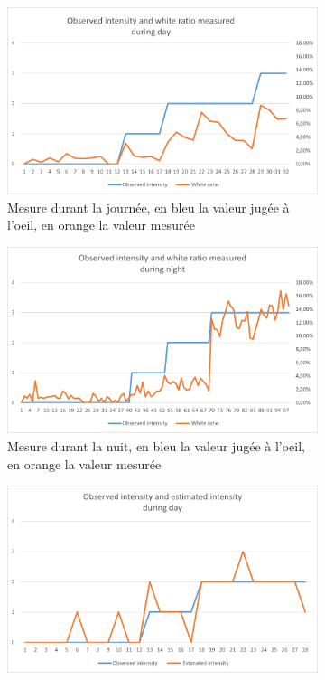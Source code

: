 \begin{figure}[H]
    \begin{subfigure}{.45\textwidth}
        \includegraphics[width=\linewidth]{Images/computer_vision/snowfall/dayMes.png}
        \caption{Mesure durant la journée, en bleu la valeur jugée à l'oeil, en orange la valeur mesurée}
        \label{fig:Snowfall_dayMes}
    \end{subfigure}
    \hfill
    \begin{subfigure}{.45\textwidth}
        \includegraphics[width=\linewidth]{Images/computer_vision/snowfall/nightMes.png}
        \caption{Mesure durant la nuit, en bleu la valeur jugée à l'oeil, en orange la valeur mesurée}
        \label{fig:Snowfall_nightMes}
    \end{subfigure}
    \hfill
    \begin{subfigure}{.45\textwidth}
        \includegraphics[width=\linewidth]{Images/computer_vision/snowfall/dayResults.png}

\end{subfigure}
\end{figure}
